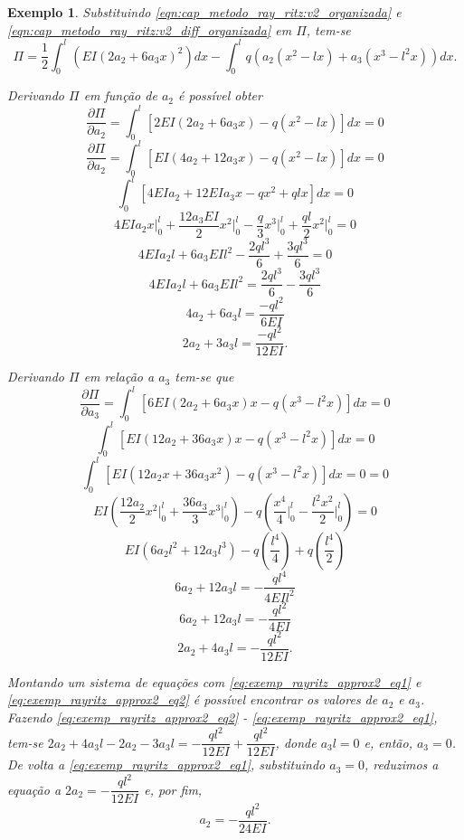 \documentclass[
	12pt,				%
	openright,			%
    twoside,			%
	a4paper,			%
	english,			%
	french,				%
	spanish,			%
	brazil				%
	]{abntex2}
\newtheorem{exemplo}{Exemplo}
\numberwithin{lema}{chapter}
\numberwithin{teorema}{chapter}
\numberwithin{definicao}{chapter}
\numberwithin{exemplo}{chapter}
\numberwithin{figure}{chapter}
\begin{document}
\begin{exemplo}
	Substituindo \eqref{eqn:cap_metodo_ray_ritz:v2_organizada} e \eqref{eqn:cap_metodo_ray_ritz:v2_diff_organizada} em $\Pi$, tem-se
	$$
		\Pi=
		\frac{1}{2}
		\int_0^l
			\left (
				EI(2a_2+6a_3x)^2
			\right ) dx
		-
		\int_0^l
			q
			\left (
				a_2(x^2-lx)
				+
				a_3(x^3-l^2x)
			\right ) dx
		\text{.}
	$$
	
	Derivando $\Pi$ em função de $a_2$ é possível obter
	$$
		\frac{\partial \Pi}{\partial a_2}
		=
		\int_0^l \left [
			2EI(2a_2+6a_3x)-q(x^2-lx)
		\right ] dx
		= 0
	$$	
	$$
		\frac{\partial \Pi}{\partial a_2}
		=
		\int_0^l \left [
			EI(4a_2+12a_3x)-q(x^2-lx)
		\right ] dx
		= 0
	$$
	$$
		\int_0^l \left [
			4EIa_2 + 12EIa_3x - qx^2 + qlx
		\right ] dx
		= 0
	$$
	$$
		4EIa_2 x \Big |_0^l
		+
		\frac{12a_3EI}{2} x^2 \Big |_0^l
		-
		\frac{q}{3} x^3 \Big |_0^l
		+
		\frac{ql}{2} x^2 \Big |_0^l
		= 0
	$$
	$$
		4EIa_2l
		+
		6a_3EIl^2
		-
		\frac{2ql^3}{6}
		+
		\frac{3ql^3}{6}
		= 0
	$$
	$$
		4EIa_2l
		+
		6a_3EIl^2
		=
		\frac{2ql^3}{6}
		-
		\frac{3ql^3}{6}
	$$
	$$
		4a_2 + 6a_3l
		=
		\frac{-ql^2}{6EI}
	$$
	\begin{equation}
		\label{eq:exemp_rayritz_approx2_eq1}
		2a_2 + 3a_3l
		=
		\frac{-ql^2}{12EI}
		\text{.}
	\end{equation}
	
	Derivando $\Pi$ em relação a $a_3$ tem-se que
	$$
		\frac{\partial \Pi}{\partial a_3}
		=
		\int_0^l \left [
			6EI(2a_2 + 6a_3x)x
			-
			q(x^3 - l^2x)
		\right ] dx
		= 0
	$$
	$$
		\int_0^l \left [
			EI(12a_2 + 36a_3x)x
			-
			q(x^3 - l^2x)
		\right ] dx
		= 0
	$$
	$$
		\int_0^l \left [
			EI(12a_2 x + 36a_3x^2)
			-
			q(x^3 - l^2x)
		\right ] dx = 0
		= 0
	$$
	$$
		EI \left (
			\frac{12a_2}{2}x^2 \Big |_0^l
			+
			\frac{36a_3}{3}x^3 \Big |_0^l
		\right )
		-
		q \left (
			\frac{x^4}{4} \Big |_0^l
			-
			\frac{l^2x^2}{2} \Big |_0^l
		\right )
		= 0
	$$
	$$
		EI(6a_2l^2 + 12a_3l^3)
		-
		q \left (
			\frac{l^4}{4}
		\right )
		+
		q \left (
			\frac{l^4}{2}
		\right )
	$$
	$$
		6a_2 + 12a_3l = -\frac{ql^4}{4EIl^2}
	$$
	$$
		6a_2 + 12a_3l = -\frac{ql^2}{4EI}
	$$
	\begin{equation}
		\label{eq:exemp_rayritz_approx2_eq2}
		2a_2 + 4a_3l = -\frac{ql^2}{12EI}
		\text{.}
	\end{equation}
	
	Montando um sistema de equações com \eqref{eq:exemp_rayritz_approx2_eq1} e \eqref{eq:exemp_rayritz_approx2_eq2} é possível encontrar os valores de $a_2$ e $a_3$. Fazendo \eqref{eq:exemp_rayritz_approx2_eq2} - \eqref{eq:exemp_rayritz_approx2_eq1}, tem-se $2a_2+4a_3l-2a_2-3a_3l=-\dfrac{ql^2}{12EI}+\dfrac{ql^2}{12EI}$, donde $a_3l=0$ e, então, $a_3=0$. De volta a \eqref{eq:exemp_rayritz_approx2_eq1}, substituindo $a_3=0$, reduzimos a equação a $2a_2=-\dfrac{ql^2}{12EI}$ e, por fim,
	$$
		a_2=-\frac{ql^2}{24EI}
		\text{.}
	$$


\end{exemplo}
\end{document}
